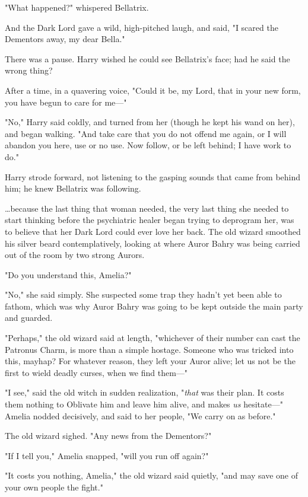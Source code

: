 "What happened?" whispered Bellatrix.

And the Dark Lord gave a wild, high-pitched laugh, and said, "I scared the
Dementors away, my dear Bella."

There was a pause. Harry wished he could see Bellatrix's face; had he said the
wrong thing?

After a time, in a quavering voice, "Could it be, my Lord, that in your new
form, you have begun to care for me---"

"No," Harry said coldly, and turned from her (though he kept his wand on her),
and began walking. "And take care that you do not offend me again, or I will
abandon you here, use or no use. Now follow, or be left behind; I have work to
do."

Harry strode forward, not listening to the gasping sounds that came from behind
him; he knew Bellatrix was following.

…because the last thing that woman needed, the very last thing she
needed to start thinking before the psychiatric healer began trying to
deprogram her, was to believe that her Dark Lord could ever love her back.
\later
The old wizard smoothed his silver beard contemplatively, looking at where
Auror Bahry was being carried out of the room by two strong Aurors.

"Do you understand this, Amelia?"

"No," she said simply. She suspected some trap they hadn't yet been able to
fathom, which was why Auror Bahry was going to be kept outside the main party
and guarded.

"Perhaps," the old wizard said at length, "whichever of their number can cast
the Patronus Charm, is more than a simple hostage. Someone who was tricked into
this, mayhap? For whatever reason, they left your Auror alive; let us not be
the first to wield deadly curses, when we find them---"

"I see," said the old witch in sudden realization, "\emph{that} was their plan.
It costs them nothing to Oblivate him and leave him alive, and makes \emph{us}
hesitate---" Amelia nodded decisively, and said to her people, "We carry on as
before."

The old wizard sighed. "Any news from the Dementors?"

"If I tell you," Amelia snapped, "will you run off again?"

"It costs you nothing, Amelia," the old wizard said quietly, "and may save one
of your own people the fight."

